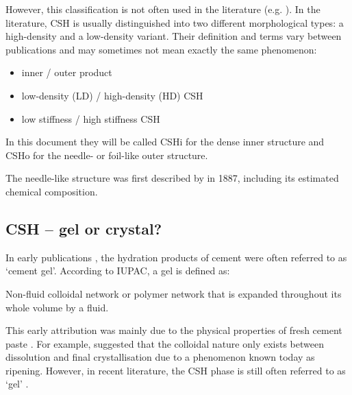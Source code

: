 However, this classification is not often used in the literature (e.g. \cite{nonat.2004,haas.2015}).
In the literature, \ac{CSH} is usually distinguished into two different morphological types: a high-density and a low-density variant.
Their definition and terms vary between publications and may sometimes not mean exactly the same phenomenon:
\begin{itemize}
    \item inner / outer product \cite{scrivener.1986, richardson.1993}
    \item low-density (LD) / high-density (HD) \ac{CSH} \cite{jennings.2000}
    \item low stiffness / high stiffness \ac{CSH} \cite{constantinides.2004}
\end{itemize}

In this document they will be called \ac{CSHi} for the dense inner structure and \ac{CSHo} for the needle- or foil-like outer structure.


The needle-like structure was first described by \textcite{lechatelier.1887} in 1887, including its estimated chemical composition.

\subsection{\acs*{CSH} – gel or crystal?}

In early publications \cite{lea.1937,powers.1958}, the hydration products of cement were often referred to as `cement gel'.
According to \textsc{IUPAC}, a gel is defined as:
\begin{iquote}
    Non-fluid colloidal network or polymer network that is expanded throughout its whole volume by a fluid. \cite{gold.2019}
\end{iquote}

This early attribution was mainly due to the physical properties of fresh cement paste \cite{lea.1937}.
For example, \textcite{baykoff.1926} suggested that the colloidal nature only exists between dissolution and final crystallisation due to a phenomenon known today as \textcite{ostwald.1897} ripening.
However, in recent literature, the \ac{CSH} phase is still often referred to as `gel' \cite{masoero.2018, walkley.2019, duque-redondo.2022}. %

